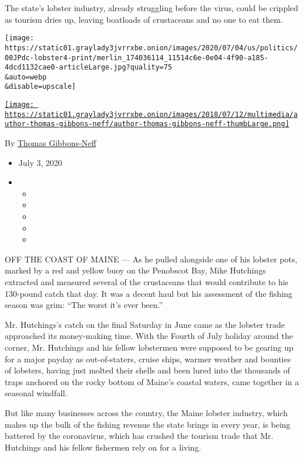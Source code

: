 The state's lobster industry, already struggling before the virus, could
be crippled as tourism dries up, leaving boatloads of crustaceans and no
one to eat them.

\texttt{[image: https://static01.graylady3jvrrxbe.onion/images/2020/07/04/us/politics/00JPdc-lobster4-print/merlin\_174036114\_11514c6e-0e04-4f90-a185-4dcd1132cae0-articleLarge.jpg?quality=75\\\&auto=webp\\\&disable=upscale]}

\href{https://www.nytimes3xbfgragh.onion/by/thomas-gibbons-neff}{\texttt{[image: https://static01.graylady3jvrrxbe.onion/images/2018/07/12/multimedia/author-thomas-gibbons-neff/author-thomas-gibbons-neff-thumbLarge.png]}}

By
\href{https://www.nytimes3xbfgragh.onion/by/thomas-gibbons-neff}{Thomas
Gibbons-Neff}

\begin{itemize}
\item
  July 3, 2020
\item
  \begin{itemize}
  \item
  \item
  \item
  \item
  \item
  \end{itemize}
\end{itemize}

OFF THE COAST OF MAINE --- As he pulled alongside one of his lobster
pots, marked by a red and yellow buoy on the Penobscot Bay, Mike
Hutchings extracted and measured several of the crustaceans that would
contribute to his 130-pound catch that day. It was a decent haul but his
assessment of the fishing season was grim: ``The worst it's ever been.''

Mr. Hutchings's catch on the final Saturday in June came as the lobster
trade approached its money-making time. With the Fourth of July holiday
around the corner, Mr. Hutchings and his fellow lobstermen were supposed
to be gearing up for a major payday as out-of-staters, cruise ships,
warmer weather and bounties of lobsters, having just molted their shells
and been lured into the thousands of traps anchored on the rocky bottom
of Maine's coastal waters, came together in a seasonal windfall.

But like many businesses across the country, the Maine lobster industry,
which makes up the bulk of the fishing revenue the state brings in every
year, is being battered by the coronavirus, which has crushed the
tourism trade that Mr. Hutchings and his fellow fishermen rely on for a
living.

